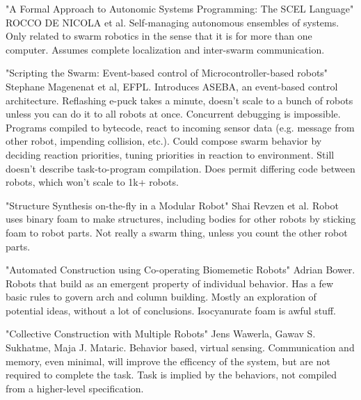 \documentclass[]{article}
\begin{document}
"A Formal Approach to Autonomic Systems Programming: The SCEL Language" \cite{nicola2014formal} ROCCO DE NICOLA et al. Self-managing autonomous ensembles of systems. Only related to swarm robotics in the sense that it is for more than one computer. Assumes complete localization and inter-swarm communication. 

"Scripting the Swarm: Event-based control of Microcontroller-based robots" \cite{magnenat2008scripting} Stephane Magenenat et al, EFPL. Introduces ASEBA, an event-based control architecture. Reflashing e-puck takes a minute, doesn't scale to a bunch of robots unless you can do it to all robots at once. Concurrent debugging is impossible. Programs compiled to bytecode, react to incoming sensor data (e.g. message from other robot, impending collision, etc.). Could compose swarm behavior by deciding reaction priorities, tuning priorities in reaction to environment. Still doesn't describe task-to-program compilation. Does permit differing code between robots, which won't scale to 1k+ robots. 

"Structure Synthesis on-the-fly in a Modular Robot" \cite{revzen2011structure} Shai Revzen et al. Robot uses binary foam to make structures, including bodies for other robots by sticking foam to robot parts. Not really a swarm thing, unless you count the other robot parts.  

"Automated Construction using Co-operating Biomemetic Robots" \cite{bowyer2000automated} Adrian Bower. Robots that build as an emergent property of individual behavior. Has a few basic rules to govern arch and column building. Mostly an exploration of potential ideas, without a lot of conclusions. Isocyanurate foam is awful stuff. 

"Collective Construction with Multiple Robots" \cite{wawerla2002collective} Jens Wawerla, Gawav S. Sukhatme, Maja J. Mataric. Behavior based, virtual sensing. Communication and memory, even minimal, will improve the efficency of the system, but are not required to complete the task. Task is implied by the behaviors, not compiled from a higher-level specification. 
\end{document}
